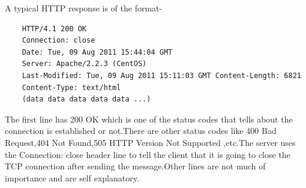 \documentclass{article}
\begin{document}
A typical HTTP response is of the format-\\
\begin{center}
    \begin{verbatim}
    HTTP/4.1 200 OK
    Connection: close
    Date: Tue, 09 Aug 2011 15:44:04 GMT
    Server: Apache/2.2.3 (CentOS)
    Last-Modified: Tue, 09 Aug 2011 15:11:03 GMT Content-Length: 6821
    Content-Type: text/html
    (data data data data data ...)
    \end{verbatim}
\end{center}
The first line has 200 OK which is one of the status codes that tells about the connection is established or not.There are other status codes like 400 Bad Request,404 Not Found,505 HTTP Version Not Supported ,etc.The server uses the Connection: close header line to tell the client that it is going to close the TCP connection after sending the message.Other lines are not much of importance and are self explanatory.\\
\end{document}
